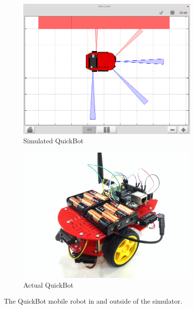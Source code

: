 \documentclass[10pt]{article}
\begin{document}
\begin{figure}[t]
  \centering
  \begin{subfigure}{0.45\textwidth}
    \includegraphics[width=\textwidth]{images/simiam-quickbot.png}
    \caption{Simulated QuickBot}
    \label{fig:simulated-quickbot}
  \end{subfigure}
  \begin{subfigure}{0.45\textwidth}
    \includegraphics[width=\textwidth]{images/quickbot-red.png}
    \caption{Actual QuickBot}
    \label{fig:actual-quickbot}
  \end{subfigure}
  \caption{The QuickBot mobile robot in and outside of the simulator.}
  \label{fig:quickbot}
\end{figure}
\end{document}
